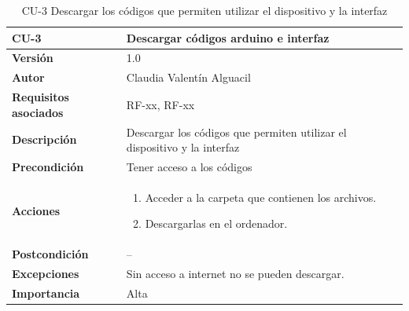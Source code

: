 \begin{table}[p]
	\centering
	\begin{tabularx}{\linewidth}{ p{} p{} }
		\toprule
		\textbf{CU-3}    & \textbf{Descargar códigos arduino e interfaz}\\
		\toprule
		\textbf{Versión}              & 1.0    \\
		\textbf{Autor}                & Claudia Valentín Alguacil \\
		\textbf{Requisitos asociados} & RF-xx, RF-xx \\
		\textbf{Descripción}          & Descargar los códigos que permiten utilizar el dispositivo y la interfaz \\
		\textbf{Precondición}         & Tener acceso a los códigos \\
		\textbf{Acciones}             &
		\begin{enumerate}
			\def\labelenumi{\arabic{enumi}.}
			\tightlist
			\item Acceder a la carpeta que contienen los archivos.
			\item Descargarlas en el ordenador.
		\end{enumerate}\\
		\textbf{Postcondición}        &  -- \\
		\textbf{Excepciones}          & Sin acceso a internet no se pueden descargar. \\
		\textbf{Importancia}          & Alta \\
		\bottomrule
	\end{tabularx}
	\caption{CU-3 Descargar los códigos que permiten utilizar el dispositivo y la interfaz}
\end{table}
